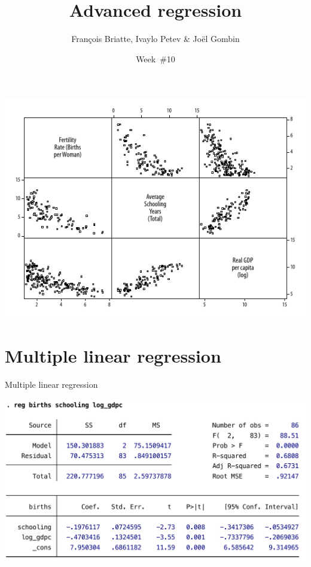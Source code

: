 \documentclass[t]{beamer}
\title{Advanced regression}
\author{François Briatte, Ivaylo Petev \& Joël Gombin}
\date{Week~\#10}
\begin{document}
    

    \frame[plain]{
        \titlepage\\[7em]
        \tableofcontents[hideallsubsections]
        }

    
		
		


	\begin{frame}[c]%
			
		\begin{center}
			\includegraphics[width=\textwidth]{mreg-gr-mat.pdf}
		\end{center}
				
	\end{frame}

    \section{Multiple linear regression}

	
	\begin{frame}[c]{Multiple linear regression} %
			
		\begin{center}
			\includegraphics[width=\textwidth]{mreg-output.pdf}
		\end{center}
				
	\end{frame}	
\end{document}

